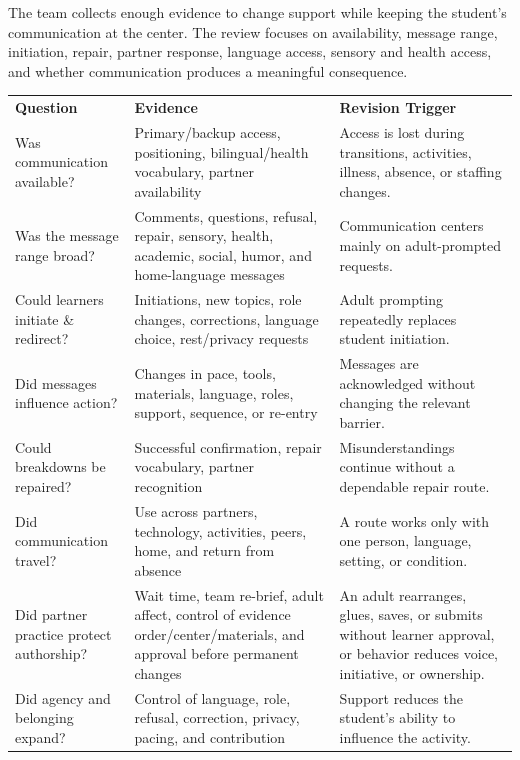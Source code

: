 \documentclass[11pt]{article}
\newcommand{\reviewsection}[1]{%
  \Needspace{4\baselineskip}
  \vspace{0.08in}\noindent{\normalsize\bfseries\color{PrimaryRed}#1}
  \par\vspace{0.025in}
}
\newcommand{\tableheaderthree}[3]{%
  \rowcolor{PrimaryRed}
  \color{white}\bfseries #1 &
  \color{white}\bfseries #2 &
  \color{white}\bfseries #3 \\
}
\begin{document}
\reviewsection{Data, Review, and Success}
The team collects enough evidence to change support while keeping the student's communication at the center. The review focuses on availability, message range, initiation, repair, partner response, language access, sensory and health access, and whether communication produces a meaningful consequence.

\renewcommand{\arraystretch}{1.0}
\setlength{\tabcolsep}{3pt}

\begin{longtable}{>{\RaggedRight\arraybackslash}p{1.25in} >{\RaggedRight\arraybackslash}p{3.00in} >{\RaggedRight\arraybackslash}p{2.80in}}
\tableheaderthree{Question}{Evidence}{Revision Trigger}

Was communication available? &
Primary/backup access, positioning, bilingual/health vocabulary, partner availability &
Access is lost during transitions, activities, illness, absence, or staffing changes. \\

\rowcolor{SoftGray}
Was the message range broad? &
Comments, questions, refusal, repair, sensory, health, academic, social, humor, and home-language messages &
Communication centers mainly on adult-prompted requests. \\

Could learners initiate \& redirect? &
Initiations, new topics, role changes, corrections, language choice, rest/privacy requests &
Adult prompting repeatedly replaces student initiation. \\

\rowcolor{SoftGray}
Did messages influence action? &
Changes in pace, tools, materials, language, roles, support, sequence, or re-entry &
Messages are acknowledged without changing the relevant barrier. \\

Could breakdowns be repaired? &
Successful confirmation, repair vocabulary, partner recognition &
Misunderstandings continue without a dependable repair route. \\

\rowcolor{SoftGray}
Did communication travel? &
Use across partners, technology, activities, peers, home, and return from absence &
A route works only with one person, language, setting, or condition. \\

Did partner practice protect authorship? &
Wait time, team re-brief, adult affect, control of evidence order/center/materials, and approval before permanent changes &
An adult rearranges, glues, saves, or submits without learner approval, or behavior reduces voice, initiative, or ownership. \\

\rowcolor{SoftGray}
Did agency and belonging expand? &
Control of language, role, refusal, correction, privacy, pacing, and contribution &
Support reduces the student's ability to influence the activity. \\

\end{longtable}
\end{document}
